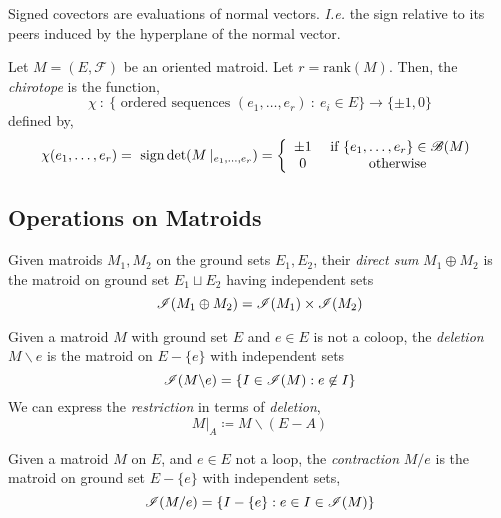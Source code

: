 \begin{definition}
    Signed covectors are evaluations of normal vectors.
    \textit{I.e.} the sign relative to its peers induced by the hyperplane of the normal vector.
\end{definition}

\begin{definition}[Chirotope]
    Let $M = (E, \mathcal{F})$ be an oriented matroid.
    Let $r = \text{rank}(M)$.
    Then, the \textit{chirotope} is the function,
    $$\chi \: : \: \{ \text{ ordered sequences } (e_1, \dots, e_r) \: : \: e_i \in E \} \rightarrow \{ \pm 1, 0 \}$$
    defined by,
    $$ \chi(e_1, \dots, e_r) = \text{ sign} \det (M \: |_{e_1, \dots, e_r} ) = \left\{ \begin{array}{c c} \pm 1 & \text{ if } \{e_1, \dots, e_r \} \in \mathscr{B}(M) \\ 0 & \text{ otherwise } \end{array} \right. $$
\end{definition}

\subsection{Operations on Matroids}

\begin{definition}
    Given matroids $M_1, M_2$ on the ground sets $E_1, E_2$, their \textit{direct sum} $M_1 \oplus M_2$ is the matroid on ground set $E_1 \sqcup E_2$ having independent sets
    $$\mathscr{I}(M_1 \oplus M_2) = \mathscr{I}(M_1) \times \mathscr{I}(M_2)$$
\end{definition}

\begin{definition}[Deletion]
    Given a matroid $M$ with ground set $E$ and $e \in E$ is not a coloop, the \textit{deletion} $M \backslash e$ is the matroid on $E - \{ e \}$ with independent sets
    $$\mathscr{I}(M \backslash e) = \lbrace I \in \mathscr{I}(M) : e \not\in I \rbrace$$
    We can express the \textit{restriction} in terms of \textit{deletion},
    $$M|_A \coloneqq M \backslash (E - A)$$
\end{definition}

\begin{definition}[Contraction]
    Given a matroid $M$ on $E$, and $e \in E$ not a loop, the \textit{contraction} $M / e$ is the matroid on ground set $E - \{ e \}$ with independent sets,
    $$\mathscr{I}(M / e) = \{ I - \{ e\}: e \in I \in \mathscr{I}(M) \}$$
\end{definition}

